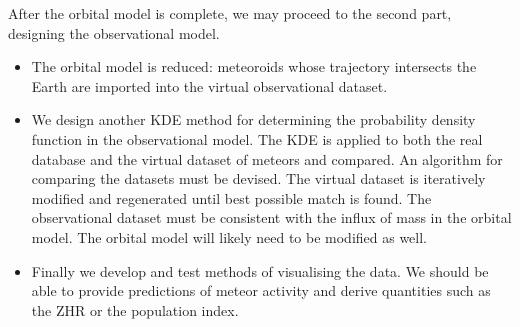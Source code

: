     After the orbital model is complete, we may proceed to the second part, designing the observational model.
    \begin{itemize}
        \item The orbital model is reduced: meteoroids whose trajectory intersects the Earth
            are imported into the virtual observational dataset.
        \item We design another KDE method for determining the probability density function
            in the observational model. The KDE is applied to both the real database and the virtual dataset
            of meteors and compared. An algorithm for comparing the datasets must be devised.
            The virtual dataset is iteratively modified and regenerated until best possible match is found.
            The observational dataset must be consistent with the influx of mass in the orbital model.
            The orbital model will likely need to be modified as well.
        \item Finally we develop and test methods of visualising the data. We should be able to provide
            predictions of meteor activity and derive quantities such as the ZHR or the population index.
    \end{itemize}
